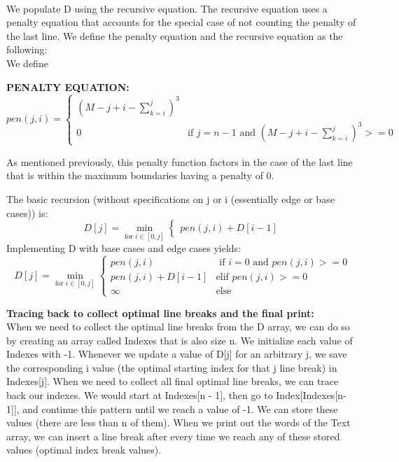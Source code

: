 \documentclass[11pt, solution, letterpaper]{format}
\begin{document}
\\
We populate D using the recursive equation. The recursive equation uses a penalty equation that accounts for the special case of not counting the penalty of the last line. We define the penalty equation and the recursive equation as the following:\\

We define 

\textbf{PENALTY EQUATION:}\\

 \[
  pen(j, i) = 
  \begin{cases}
                                   
                   (M - j + i - \sum_{k=i}^{j})^3 \\ 
                   0
                   & \text{if }j = n - 1 \text{ and }(M - j + i - \sum_{k=i}^{j})^3 >= 0
                    
                    

  \end{cases}
\]

As mentioned previously, this penalty function factors in the case of the last line that is within the maximum boundaries having a penalty of 0.

The basic recursion (without specifications on j or i (essentially edge or base cases)) is:
 \[
  D[j] = \min_{\text{for } i \in [0, j]} 
  \begin{cases}
                                   
                   
                    pen(j, i) + D[i - 1] 
                    

  \end{cases}
\]
Implementing D with base cases and edge cases yields:
 \[
  D[j] = \min_{\text{for } i \in [0, j]} 
  \begin{cases}
                    pen(j, i) & \text{ if } i=0 \text{ and } pen(j, i) >= 0 \\                
                    pen(j, i) + D[i - 1] & \text{elif } pen(j, i) >= 0   \\      
                    \infty & \text{else}

  \end{cases}
\]

\textbf{Tracing back to collect optimal line breaks and the final print:}\\
When we need to collect the optimal line breaks from the D array, we can do so by creating an array called Indexes that is also size n. We initialize each value of Indexes with -1. Whenever we update a value of D[j] for an arbitrary j, we save the corresponding i value (the optimal starting index for that j line break) in Indexes[j]. When we need to collect all final optimal line breaks, we can trace back our indexes. We would start at Indexes[n - 1], then go to Index[Indexes[n-1]], and continue this pattern until we reach a value of -1. We can store these values (there are less than n of them). When we print out the words of the Text array, we can insert a line break after every time we reach any of these stored values (optimal index break values).\\
\end{document}
